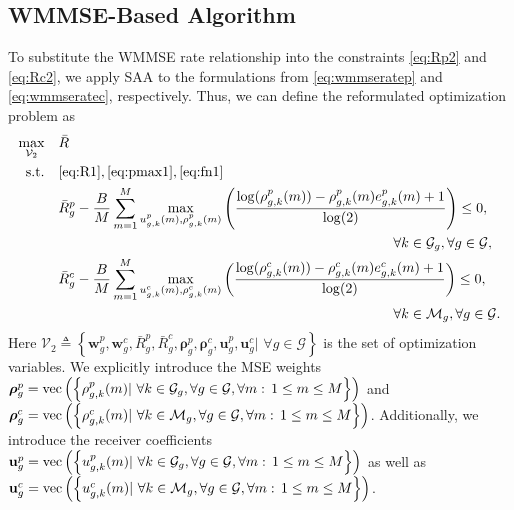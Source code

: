 \documentclass[12pt,draftcls,onecolumn]{IEEEtran}
\theoremstyle{remark}
\theoremstyle{definition}
\begin{document}
{\subsection{WMMSE-Based Algorithm}
To substitute the WMMSE rate relationship into the constraints \eqref{eq:Rp2} and \eqref{eq:Rc2}, we apply SAA to the formulations from \eqref{eq:wmmseratep} and \eqref{eq:wmmseratec}, respectively. Thus, we can define the reformulated optimization problem as
\begin{subequations}\label{eq:Opt2}
	\begin{align}
		\underset{\mathcal{V}_2}{\text{max}}\quad &\bar{R}  \\
		\text{s.t.} \quad & \eqref{eq:R1}, \eqref{eq:pmax1}, \eqref{eq:fn1} \nonumber \\
		& \bar{R}_{g}^{p} - \frac{B}{M} \sum_{m=1}^{M} \underset{u_{g,k}^p(m),\rho_{g,k}^p(m)}{\text{max}} \left( \frac{\log(\rho_{g,k}^p(m))-\rho_{g,k}^p(m) e_{g,k}^p(m) + 1}{\log(2)} \right) \leq 0, \nonumber\\
		& \qquad\qquad\qquad\qquad\qquad\qquad\qquad\qquad\qquad\qquad\qquad\qquad \forall k \in \mathcal{G}_g, \forall g \in \mathcal{G}, \label{eq:Rp3}\\	
		& \bar{R}_{g}^{c} - \frac{B}{M} \sum_{m=1}^{M} \underset{u_{g,k}^c(m),\rho_{g,k}^c(m)}{\text{max}} \left( \frac{\log(\rho_{g,k}^c(m))-\rho_{g,k}^c(m) e_{g,k}^c(m) + 1}{\log(2)} \right) \leq 0, \nonumber\\
		& \qquad\qquad\qquad\qquad\qquad\qquad\qquad\qquad\qquad\qquad\qquad\qquad \forall k \in \mathcal{M}_g, \forall g \in \mathcal{G}. \label{eq:Rc3}
	\end{align}
\end{subequations}  
Here $\mathcal{V}_2 \triangleq \left\lbrace \mathbf{w}_{g}^p, \mathbf{w}_{g}^c, \bar{R}_{g}^{p}, \bar{R}_{g}^{c}, {\bm \rho}_g^p,{\bm \rho}_g^c,\mathbf{u}_g^p,\mathbf{u}_g^c|\,\, \forall g \in \mathcal{G} \right\rbrace$ is the set of optimization variables. We explicitly introduce the MSE weights ${\bm \rho}_g^p = {\rm vec}\left(\left\{ \rho_{g,k}^p(m) | \,\, \forall k \in \mathcal{G}_g,\forall g \in \mathcal{G}, {\forall m: \, 1\leq m \leq M} \right\}\right)$ and ${\bm \rho}_g^c = {\rm vec}\left(\left\{ \rho_{g,k}^c(m) |\,\, \forall k \in \mathcal{M}_g, \forall g \in \mathcal{G}, \forall m: \, 1\leq m \leq M \right\}\right)$. Additionally, we introduce the receiver coefficients $\mathbf{u}_g^p = {\rm vec}\left(\left\{ u_{g,k}^p(m) | \,\,\forall k \in \mathcal{G}_g, \forall g \in \mathcal{G}, \forall m: \, 1\leq m \leq M \right\}\right)$ as well as $\mathbf{u}_g^c = {\rm vec}\left(\left\{ u_{g,k}^c(m) |\,\, \forall k \in \mathcal{M}_g, \forall g \in \mathcal{G}, \forall m: \, 1\leq m \leq M \right\}\right)$.
}
\end{document}
